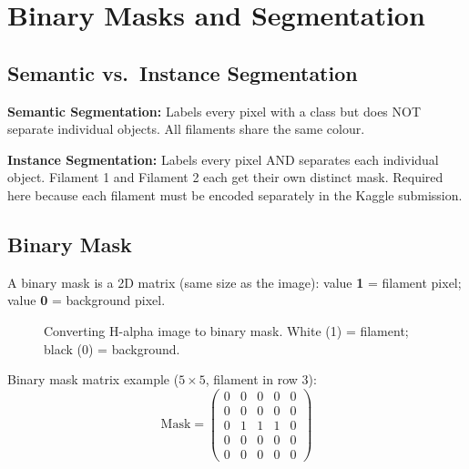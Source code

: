 \documentclass[12pt,a4paper,openany]{report}
\begin{document}
\chapter{Binary Masks and Segmentation}

\section{Semantic vs.\ Instance Segmentation}

\begin{defbox}
\textbf{Semantic Segmentation:} Labels every pixel with a class but does NOT separate
individual objects. All filaments share the same colour.

\vspace{4pt}
\textbf{Instance Segmentation:} Labels every pixel AND separates each individual object.
Filament 1 and Filament 2 each get their own distinct mask. Required here because each
filament must be encoded separately in the Kaggle submission.
\end{defbox}

\section{Binary Mask}

A binary mask is a 2D matrix (same size as the image):
value \textbf{1} = filament pixel; value \textbf{0} = background pixel.

\begin{figure}[H]
\centering
{}
\caption{Converting H-alpha image to binary mask. White (1) = filament; black (0) = background.}
\label{fig:binmask}
\end{figure}

Binary mask matrix example ($5\times5$, filament in row 3):
\[
\text{Mask} = \begin{pmatrix}
0 & 0 & 0 & 0 & 0 \\
0 & 0 & 0 & 0 & 0 \\
0 & 1 & 1 & 1 & 0 \\
0 & 0 & 0 & 0 & 0 \\
0 & 0 & 0 & 0 & 0
\end{pmatrix}
\]
\end{document}
